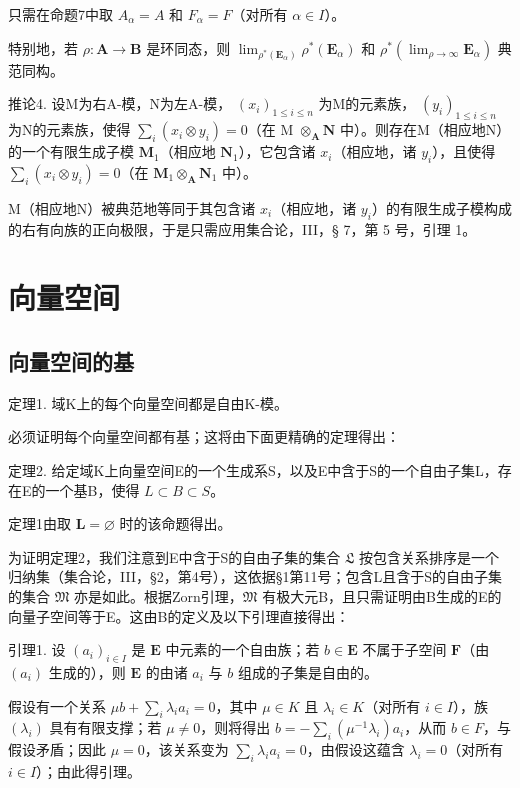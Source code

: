 只需在命题7中取 \(A_{\alpha} = A\) 和 \(F_{\alpha} = F\)（对所有 \(\alpha \in I\)）。

特别地，若 \(\rho: \mathbf{A} \to \mathbf{B}\) 是环同态，则 \(\lim_{\rho^* (\mathbf{E}_\alpha)} \rho^*(\mathbf{E}_\alpha)\) 和 \(\rho^*(\lim_{\rho \to \infty} \mathbf{E}_\alpha)\) 典范同构。

推论4. 设M为右A-模，N为左A-模， \((x_{i})_{1\leqslant i\leqslant n}\) 为M的元素族， \((y_{i})_{1\leqslant i\leqslant n}\) 为N的元素族，使得 \(\sum_{i}(x_{i}\otimes y_{i}) = 0\)（在 M \(\otimes_{\mathbf{A}}\mathbf{N}\) 中）。则存在M（相应地N）的一个有限生成子模 \(\mathbf{M}_1\)（相应地 \(\mathbf{N}_1\)），它包含诸 \(x_{i}\)（相应地，诸 \(y_{i}\)），且使得 \(\sum_{i}(x_{i}\otimes y_{i}) = 0\)（在 \(\mathbf{M}_1\otimes_{\mathbf{A}}\mathbf{N}_1\) 中）。

M（相应地N）被典范地等同于其包含诸 \(x_{i}\)（相应地，诸 \(y_{i}\)）的有限生成子模构成的右有向族的正向极限，于是只需应用集合论，III，§ 7，第 5 号，引理 1。

\section{向量空间}

\subsection{向量空间的基}

定理1. 域K上的每个向量空间都是自由K-模。

必须证明每个向量空间都有基；这将由下面更精确的定理得出：

定理2. 给定域K上向量空间E的一个生成系S，以及E中含于S的一个自由子集L，存在E的一个基B，使得 \(L \subset B \subset S\)。

定理1由取 \(\mathbf{L} = \varnothing\) 时的该命题得出。

为证明定理2，我们注意到E中含于S的自由子集的集合 \(\mathfrak{L}\) 按包含关系排序是一个归纳集（集合论，III，§2，第4号），这依据§1第11号；包含L且含于S的自由子集的集合 \(\mathfrak{M}\) 亦是如此。根据Zorn引理，\(\mathfrak{M}\) 有极大元B，且只需证明由B生成的E的向量子空间等于E。这由B的定义及以下引理直接得出：

引理1. 设 \((a_{i})_{i\in I}\) 是 \(\mathbf{E}\) 中元素的一个自由族；若 \(b\in \mathbf{E}\) 不属于子空间 \(\mathbf{F}\)（由 \((a_{i})\) 生成的），则 \(\mathbf{E}\) 的由诸 \(a_{i}\) 与 \(b\) 组成的子集是自由的。

假设有一个关系 \(\mu b + \sum_{i} \lambda_i a_i = 0\)，其中 \(\mu \in K\) 且 \(\lambda_i \in K\)（对所有 \(i \in I\)），族 \((\lambda_i)\) 具有有限支撑；若 \(\mu \neq 0\)，则将得出 \(b = -\sum_{i} (\mu^{-1} \lambda_i) a_i\)，从而 \(b \in F\)，与假设矛盾；因此 \(\mu = 0\)，该关系变为 \(\sum_{i} \lambda_i a_i = 0\)，由假设这蕴含 \(\lambda_i = 0\)（对所有 \(i \in I\)）；由此得引理。

